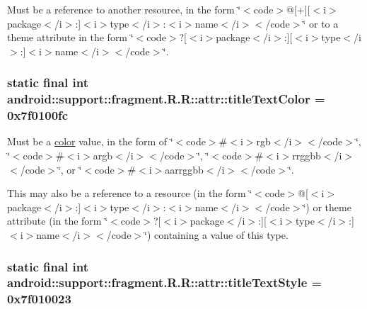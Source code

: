 Must be a reference to another resource, in the form \char`\"{}$<$code$>$@\mbox{[}+\mbox{]}\mbox{[}$<$i$>$package$<$/i$>$:\mbox{]}$<$i$>$type$<$/i$>$:$<$i$>$name$<$/i$>$$<$/code$>$\char`\"{} or to a theme attribute in the form \char`\"{}$<$code$>$?\mbox{[}$<$i$>$package$<$/i$>$:\mbox{]}\mbox{[}$<$i$>$type$<$/i$>$:\mbox{]}$<$i$>$name$<$/i$>$$<$/code$>$\char`\"{}. \hypertarget{classandroid_1_1support_1_1fragment_1_1_r_1_1attr_6155a531661f29d0aa2d45252ff13314}{
\subsubsection[{titleTextColor}]{\setlength{\rightskip}{0pt plus 5cm}static final int android::support::fragment.R.R::attr::titleTextColor = 0x7f0100fc}}
\label{classandroid_1_1support_1_1fragment_1_1_r_1_1attr_6155a531661f29d0aa2d45252ff13314}


Must be a \hyperlink{classandroid_1_1support_1_1fragment_1_1_r_1_1color}{color} value, in the form of \char`\"{}$<$code$>$\#$<$i$>$rgb$<$/i$>$$<$/code$>$\char`\"{}, \char`\"{}$<$code$>$\#$<$i$>$argb$<$/i$>$$<$/code$>$\char`\"{}, \char`\"{}$<$code$>$\#$<$i$>$rrggbb$<$/i$>$$<$/code$>$\char`\"{}, or \char`\"{}$<$code$>$\#$<$i$>$aarrggbb$<$/i$>$$<$/code$>$\char`\"{}. 

This may also be a reference to a resource (in the form \char`\"{}$<$code$>$@\mbox{[}$<$i$>$package$<$/i$>$:\mbox{]}$<$i$>$type$<$/i$>$:$<$i$>$name$<$/i$>$$<$/code$>$\char`\"{}) or theme attribute (in the form \char`\"{}$<$code$>$?\mbox{[}$<$i$>$package$<$/i$>$:\mbox{]}\mbox{[}$<$i$>$type$<$/i$>$:\mbox{]}$<$i$>$name$<$/i$>$$<$/code$>$\char`\"{}) containing a value of this type. \hypertarget{classandroid_1_1support_1_1fragment_1_1_r_1_1attr_2ea0b694e59d34ad1f76c1f59827ccc4}{
\subsubsection[{titleTextStyle}]{\setlength{\rightskip}{0pt plus 5cm}static final int android::support::fragment.R.R::attr::titleTextStyle = 0x7f010023}}
\label{classandroid_1_1support_1_1fragment_1_1_r_1_1attr_2ea0b694e59d34ad1f76c1f59827ccc4}


